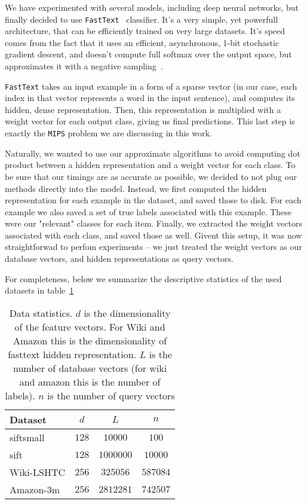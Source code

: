         We have experimented with several models, including deep neural networks, but finally decided to
        use \texttt{FastText}~\cite{fasttext} classifier. It's a very simple, yet powerfull architecture, that
        can be efficiently trained on very large datasets. It's speed comes from the fact that it uses an efficient,
        asynchronous, 1-bit stochastic gradient descent, and doesn't compute full softmax over the output space,
        but approximates it with a negative sampling~\cite{w2v}.

        \texttt{FastText} takes an input example in a form of a sparse vector (in our case, each index in that vector
        represents a word in the input sentence), and computes its hidden, dense representation. Then, this
        representation is multiplied with a weight vector for each output class, giving us final predictions.
        This last step is exactly the \texttt{MIPS} problem we are discussing in this work.

        Naturally, we wanted to use our approximate algorithms to avoid computing dot product between a hidden
        representation and a weight vector for each class. To be sure that our timings are as accurate as possible,
        we decided to not plug our methods directly into the model. Instead, we first computed the hidden representation
        for each example in the dataset, and saved those to disk. For each example we also saved a set of
        true labels associated with this example. These were our "relevant" classes for each item.
        Finally, we extracted the weight vectors associated with each class, and saved those as well. Givent this setup,
        it was now straightforwad to perfom experiments -- we just treated the weight vectors as our database vectors,
        and hidden representations as query vectors.

        For completeness, below we summarize the descriptive statistics of the used datasets in table~\ref{tab:dsz}

        \begin{table}
          \caption{Data statistics. $d$ is the dimensionality of the feature vectors. For Wiki and Amazon this
          is the dimensionality of fasttext hidden representation. $L$ is the number
          of database vectors (for wiki and amazon this is the number of labels). $n$ is the number of query vectors}
          \label{tab:dsz}
          \centering
          {
          \begin{tabular}{l|c|c|c|}
            Dataset & $d$ &$L$& $n$ \\
            \hline
            siftsmall   & $128$ & $10000$   & $100$    \\
            sift        & $128$ & $1000000$ & $10000$  \\
            Wiki-LSHTC  & $256$ & $325056$  & $587084$ \\
            Amazon-3m   & $256$ & $2812281$ & $742507$ \\
          \end{tabular}
          }
        \end{table}


